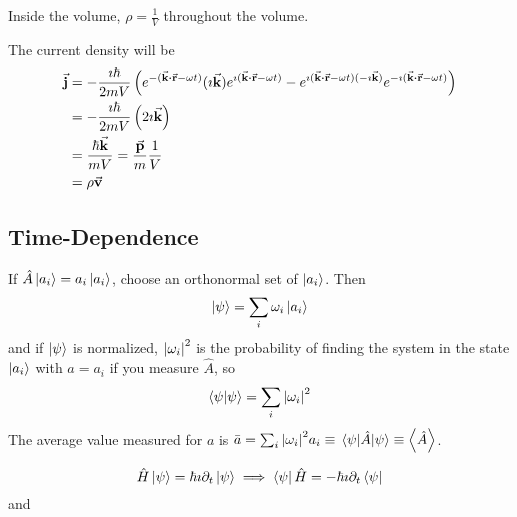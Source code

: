 \documentclass[a4paper,twoside,master.tex]{subfiles}
\begin{document}
Inside the volume, $ \rho = \frac{1}{V} $ throughout the volume.

The current density will be
\begin{align}
    \va{j} &= - \frac{\imath \hbar}{2mV} \left( e^{-(\va{k} \vdot \va{r} - \omega t)} (\imath \va{k}) e^{\imath (\va{k} \vdot \va{r} - \omega t)} - e^{\imath (\va{k} \vdot \va{r} - \omega t) (- \imath \va{k})} e^{- \imath (\va{k} \vdot \va{r} - \omega t)} \right)\\
    &= - \frac{\imath \hbar}{2mV} \left( 2 \imath \va{k} \right)\\
    &= \frac{\hbar \va{k}}{mV} = \frac{\va{p}}{m} \frac{1}{V}\\
    &= \rho \va{v}
\end{align}

\subsection{Time-Dependence}
\label{sub:time-dependence}
If $ \hat{A}\ket{a_i} = a_i\ket{a_i} $, choose an orthonormal set of $\ket{a_i} $. Then
\begin{equation}
    \ket{\psi} = \sum_i \omega_i\ket{a_i}
\end{equation}
and if $\ket{\psi} $ is normalized, $ \abs{\omega_i}^2 $ is the probability of finding the system in the state $\ket{a_i} $ with $ a = a_i $ if you measure $ \hat{A} $, so
\begin{equation}
    \bra{\psi}\ket{\psi} = \sum_i \abs{\omega_i}^2
\end{equation}
The average value measured for $ a $ is $ \bar{a} = \sum_i \abs{\omega_i}^2 a_i \equiv \ev{\hat{A}}{\psi} \equiv \ev{\hat{A}} $.

\begin{equation}
    \hat{H}\ket{\psi} = \hbar \imath \partial_t\ket{\psi} \implies\bra{\psi} \hat{H} = - \hbar \imath \partial_t\bra{\psi}
\end{equation}
and
\end{document}
